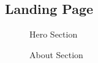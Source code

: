 \documentclass[oneside,a4paper,12pt,explicit]{book}
\begin{document}
\subsection{Landing Page}
\begin{figure}[H]
    \centering
    \begin{minipage}{0.4\textwidth}
        \centering
        \caption{Hero Section}
    \end{minipage}
    \hfill
    \begin{minipage}{0.5\textwidth}
        \centering
        \caption{About Section}
    \end{minipage}
\end{figure}
\end{document}
